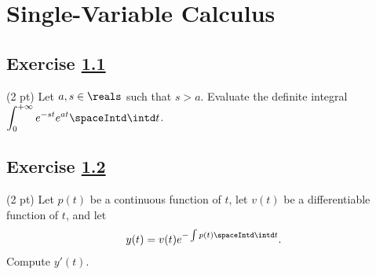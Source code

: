 %
%
\section{Single-Variable Calculus}



\subsection{Exercise \ref{sec : Single Variable Calculus Q1}}
\label{sec : Single Variable Calculus Q1}


(2 pt) Let $a,s \in \reals$ such that $s > a$. Evaluate the definite integral $\displaystyle\int_{0}^{+\infty} e^{-s t} e^{a t} \spaceIntd \intd t$.




\subsection{Exercise \ref{sec : Single Variable Calculus Q2}}
\label{sec : Single Variable Calculus Q2}


(2 pt) Let $p(t)$ be a continuous function of $t$, let $v(t)$ be a differentiable function of $t$, and let
\begin{align*}
y(t)
=
v(t) e^{-\int p(t) \spaceIntd \intd t}.
\end{align*}
Compute $y'(t)$.

